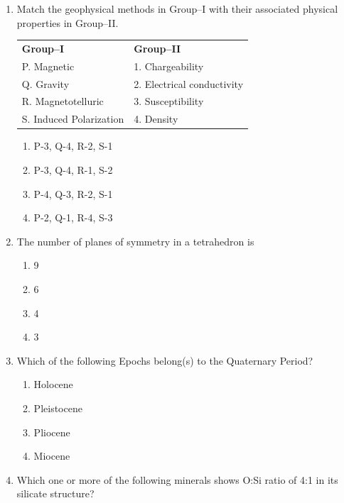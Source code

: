 \documentclass[journal,12pt,onecolumn]{IEEEtran}
\begin{document}
\begin{enumerate}
\item Match the geophysical methods in Group–I with their associated physical properties in Group–II.
\begin{tabular}{ll}
\textbf{Group–I} & \textbf{Group–II} \\
P. Magnetic & 1. Chargeability \\
Q. Gravity & 2. Electrical conductivity \\
R. Magnetotelluric & 3. Susceptibility \\
S. Induced Polarization & 4. Density \\
\end{tabular}

\hfill{}

\begin{enumerate}
    \item P-3, Q-4, R-2, S-1
    \item P-3, Q-4, R-1, S-2
    \item P-4, Q-3, R-2, S-1
    \item P-2, Q-1, R-4, S-3
\end{enumerate}
\newpage
\item The number of planes of symmetry in a tetrahedron is

\hfill{}

\begin{multicols}{4}
\begin{enumerate}
    \item 9
    \item 6
    \item 4
    \item 3
\end{enumerate}
\end{multicols}


\item Which of the following Epochs belong(s) to the Quaternary Period?  

\hfill{}

\begin{multicols}{2}
\begin{enumerate}
\item Holocene
\item Pleistocene
\item Pliocene
\item Miocene
\end{enumerate}
\end{multicols}

\item Which one or more of the following minerals shows O:Si ratio of 4:1 in its silicate structure?  


\end{enumerate}
\end{document}
